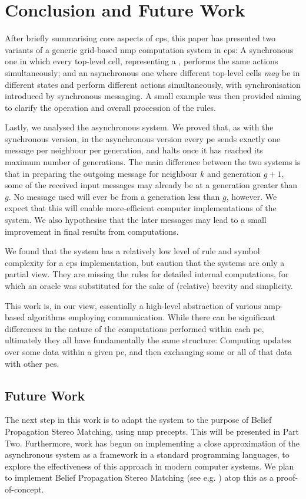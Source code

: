 \section{Conclusion and Future Work}
After briefly summarising core aspects of \gls{cps}, this paper has presented two variants of a generic grid-based \gls{nmp} computation system in \gls{cps}:  A synchronous one in which every top-level cell, representing a , performs the same actions simultaneously;  and an asynchronous one where different top-level cells \emph{may} be in different states and perform different actions simultaneously, with synchronisation introduced by synchronous messaging.  A small example was then provided aiming to clarify the operation and overall procession of the rules.


Lastly, we analysed the asynchronous system.  We proved that, as with the synchronous version, in the asynchronous version every \gls{pe} sends exactly one message per neighbour per generation, and halts once it has reached its maximum number of generations.  The main difference between the two systems is that in preparing the outgoing message for neighbour \(k\) and generation \(g + 1\), some of the received input messages may already be at a generation greater than \(g\).  No message used will ever be from a generation less than \(g\), however.  We expect that this will enable more-efficient computer implementations of the system.  We also hypothesise that the later messages may lead to a small improvement in final results from computations.

We found that the system has a relatively low level of rule and symbol complexity for a \gls{cps} implementation, but caution that the systems are only a partial view.  They are missing the rules for detailed internal computations, for which an oracle was substituted for the sake of (relative) brevity and simplicity.

This work is, in our view, essentially a high-level abstraction of various \gls{nmp}-based algorithms employing communication.  While there can be significant differences in the nature of the computations performed within each \gls{pe}, ultimately they all have fundamentally the same structure:  Computing updates over some data within a given \gls{pe}, and then exchanging some or all of that data with other \glspl{pe}.

\subsection{Future Work}
The next step in this work is to adapt the system to the purpose of Belief Propagation Stereo Matching, using \gls{nmp} precepts.  This will be presented in Part Two.  Furthermore, work has begun on implementing a close approximation of the asynchronous system as a framework in a standard programming languages, to explore the effectiveness of this approach in modern computer systems.  We plan to implement Belief Propagation Stereo Matching (see e.g. \cite{Blake2011,Felzenszwalb2011,JianSun2003}) atop this as a proof-of-concept.

